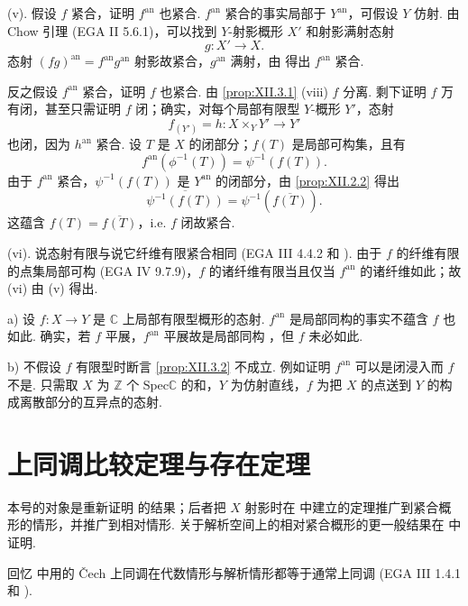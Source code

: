 (v). 假设 $f$ 紧合，证明 $f^{\mathrm{an}}$ 也紧合. $f^{\mathrm{an}}$ 紧合的事实局部于 $Y^{\mathrm{an}}$，可假设 $Y$ 仿射. 由 Chow 引理 (EGA II 5.6.1)，可以找到 $Y$-射影概形 $X'$ 和射影满射态射
\[
g \colon X' \longrightarrow X.
\]
态射 $(fg)^{\mathrm{an}} = f^{\mathrm{an}} g^{\mathrm{an}}$ 射影故紧合，$g^{\mathrm{an}}$ 满射，由 \cite[第 1 章 §10]{exp12-1} 得出 $f^{\mathrm{an}}$ 紧合.

反之假设 $f^{\mathrm{an}}$ 紧合，证明 $f$ 也紧合. 由 \ref{prop:XII.3.1} (viii) $f$ 分离. 剩下证明 $f$ 万有闭，甚至只需证明 $f$ 闭；确实，对每个局部有限型 $Y$-概形 $Y'$，态射
\[
f_{(Y')} = h \colon X \times_Y Y' \longrightarrow Y'
\]
也闭，因为 $h^{\mathrm{an}}$ 紧合. 设 $T$ 是 $X$ 的闭部分；$f(T)$ 是局部可构集，且有
\[
f^{\mathrm{an}}(\phi^{-1}(T)) = \psi^{-1}(f(T)).
\]
由于 $f^{\mathrm{an}}$ 紧合，$\psi^{-1}(f(T))$ 是 $Y^{\mathrm{an}}$ 的闭部分，由 \ref{prop:XII.2.2} 得出
\[
\overline{\psi^{-1}(f(T))} = \psi^{-1}(\overline{f(T)}).
\]
这蕴含 $f(T) = \overline{f(T)}$，i.e. $f$ 闭故紧合.

(vi). 说态射有限与说它纤维有限紧合相同 (EGA III 4.4.2 和 \cite[第 19 号 §5]{exp12-4}). 由于 $f$ 的纤维有限的点集局部可构 (EGA IV 9.7.9)，$f$ 的诸纤维有限当且仅当 $f^{\mathrm{an}}$ 的诸纤维如此；故 (vi) 由 (v) 得出.

\begin{remark}\label{rem:XII.3.3}
a) 设 $f \colon X \to Y$ 是 $\mathbb{C}$ 上局部有限型概形的态射. $f^{\mathrm{an}}$ 是局部同构的事实不蕴含 $f$ 也如此. 确实，若 $f$ 平展，$f^{\mathrm{an}}$ 平展故是局部同构 \cite[第 13 号 §1]{exp12-4}，但 $f$ 未必如此.

b) 不假设 $f$ 有限型时断言 \ref{prop:XII.3.2} 不成立. 例如证明 $f^{\mathrm{an}}$ 可以是闭浸入而 $f$ 不是. 只需取 $X$ 为 $\mathbb{Z}$ 个 $\mathrm{Spec} \mathbb{C}$ 的和，$Y$ 为仿射直线，$f$ 为把 $X$ 的点送到 $Y$ 的构成离散部分的互异点的态射.
\end{remark}

\section{上同调比较定理与存在定理}

本号的对象是重新证明 \cite[第 2 号 定理 5 和 定理 6]{exp12-3} 的结果；后者把 $X$ 射影时在 \cite[第 12 号]{exp12-10} 中建立的定理推广到紧合概形的情形，并推广到相对情形. 关于解析空间上的相对紧合概形的更一般结果在 \cite[第八章 第 3 号]{exp12-7} 中证明.

回忆 \cite[第 12 号]{exp12-10} 中用的 Čech 上同调在代数情形与解析情形都等于通常上同调 (EGA III 1.4.1 和 \cite[II 5.10]{exp12-5}).

